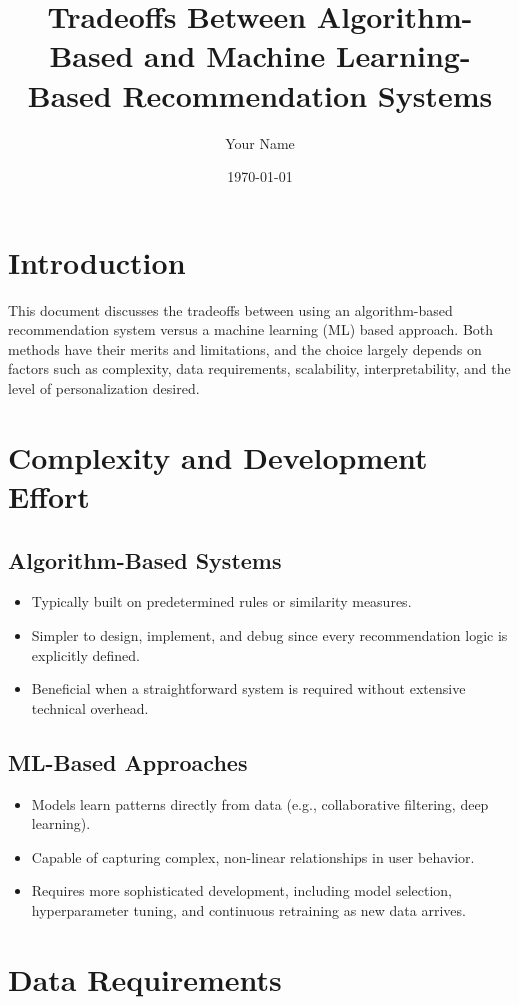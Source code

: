 \documentclass{article}
\title{Tradeoffs Between Algorithm-Based and Machine Learning-Based Recommendation Systems}
\author{Your Name}
\date{\today}
\begin{document}
\maketitle

\section{Introduction}
This document discusses the tradeoffs between using an algorithm-based recommendation system versus a machine learning (ML) based approach. Both methods have their merits and limitations, and the choice largely depends on factors such as complexity, data requirements, scalability, interpretability, and the level of personalization desired.

\section{Complexity and Development Effort}
\subsection{Algorithm-Based Systems}
\begin{itemize}
    \item Typically built on predetermined rules or similarity measures.
    \item Simpler to design, implement, and debug since every recommendation logic is explicitly defined.
    \item Beneficial when a straightforward system is required without extensive technical overhead.
\end{itemize}

\subsection{ML-Based Approaches}
\begin{itemize}
    \item Models learn patterns directly from data (e.g., collaborative filtering, deep learning).
    \item Capable of capturing complex, non-linear relationships in user behavior.
    \item Requires more sophisticated development, including model selection, hyperparameter tuning, and continuous retraining as new data arrives.
\end{itemize}

\section{Data Requirements}
\end{document}
